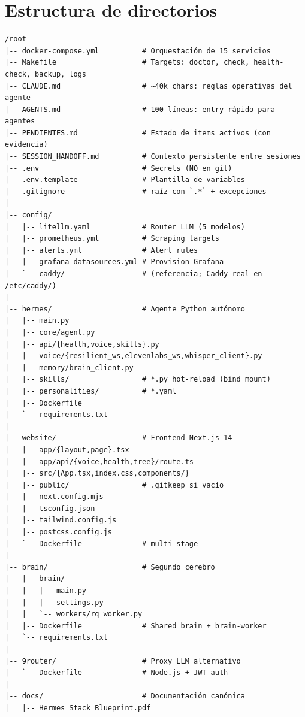 \documentclass[11pt,a4paper]{article}
\begin{document}
\newpage

\section{Estructura de directorios}

\begin{lstlisting}[language=bashx]
/root
|-- docker-compose.yml          # Orquestación de 15 servicios
|-- Makefile                    # Targets: doctor, check, health-check, backup, logs
|-- CLAUDE.md                   # ~40k chars: reglas operativas del agente
|-- AGENTS.md                   # 100 líneas: entry rápido para agentes
|-- PENDIENTES.md               # Estado de items activos (con evidencia)
|-- SESSION_HANDOFF.md          # Contexto persistente entre sesiones
|-- .env                        # Secrets (NO en git)
|-- .env.template               # Plantilla de variables
|-- .gitignore                  # raíz con `.*` + excepciones
|
|-- config/
|   |-- litellm.yaml            # Router LLM (5 modelos)
|   |-- prometheus.yml          # Scraping targets
|   |-- alerts.yml              # Alert rules
|   |-- grafana-datasources.yml # Provision Grafana
|   `-- caddy/                  # (referencia; Caddy real en /etc/caddy/)
|
|-- hermes/                     # Agente Python autónomo
|   |-- main.py
|   |-- core/agent.py
|   |-- api/{health,voice,skills}.py
|   |-- voice/{resilient_ws,elevenlabs_ws,whisper_client}.py
|   |-- memory/brain_client.py
|   |-- skills/                 # *.py hot-reload (bind mount)
|   |-- personalities/          # *.yaml
|   |-- Dockerfile
|   `-- requirements.txt
|
|-- website/                    # Frontend Next.js 14
|   |-- app/{layout,page}.tsx
|   |-- app/api/{voice,health,tree}/route.ts
|   |-- src/{App.tsx,index.css,components/}
|   |-- public/                 # .gitkeep si vacío
|   |-- next.config.mjs
|   |-- tsconfig.json
|   |-- tailwind.config.js
|   |-- postcss.config.js
|   `-- Dockerfile              # multi-stage
|
|-- brain/                      # Segundo cerebro
|   |-- brain/
|   |   |-- main.py
|   |   |-- settings.py
|   |   `-- workers/rq_worker.py
|   |-- Dockerfile              # Shared brain + brain-worker
|   `-- requirements.txt
|
|-- 9router/                    # Proxy LLM alternativo
|   `-- Dockerfile              # Node.js + JWT auth
|
|-- docs/                       # Documentación canónica
|   |-- Hermes_Stack_Blueprint.pdf

\end{lstlisting}
\end{document}
